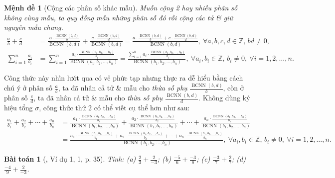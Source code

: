 \documentclass{article}
\newtheorem{baitoan}{Bài toán}
\newtheorem{menhde}{Mệnh đề}
\begin{document}
\begin{menhde}[Cộng các phân số khác mẫu]
	Muốn cộng 2 hay nhiều phân số không cùng mẫu, ta quy đồng mẫu những phân số đó rồi cộng các tử \& giữ nguyên mẫu chung.
	\begin{align*}
		\frac{a}{b} + \frac{c}{d} &= \frac{a\cdot\frac{\operatorname{BCNN}(b,d)}{b}}{\operatorname{BCNN}(b,d)} + \frac{c\cdot\frac{\operatorname{BCNN}(b,d)}{d}}{\operatorname{BCNN}(b,d)} = \frac{a\cdot\frac{\operatorname{BCNN}(b,d)}{b} + c\cdot\frac{\operatorname{BCNN}(b,d)}{d}}{\operatorname{BCNN}(b,d)},\ \forall a,b,c,d\in\mathbb{Z},\,bd\ne0,\\
		\sum_{i=1}^n \frac{a_i}{b_i} &= \sum_{i=1}^n \frac{a_i\cdot\frac{\operatorname{BCNN}(b_1,b_2,\ldots,b_n)}{b_i}}{\operatorname{BCNN}(b_1,b_2,\ldots,b_n)} = \frac{\sum_{i=1}^n a_i\cdot\frac{\operatorname{BCNN}(b_1,b_2,\ldots,b_n)}{b_i}}{\operatorname{BCNN}(b_1,b_2,\ldots,b_n)},\ \forall a_i,b_i\in\mathbb{Z},\,b_i\ne0,\ \forall i = 1,2,\ldots,n.
	\end{align*}
\end{menhde}
Công thức này nhìn lướt qua có vẻ phức tạp nhưng thực ra dễ hiểu bằng cách chú ý ở phân số $\frac{a}{b}$, ta đã nhân cả tử \& mẫu cho \textit{thừa số phụ} $\frac{\operatorname{BCNN}(b,d)}{b}$, còn ở phân số $\frac{c}{d}$, ta đã nhân cả tử \& mẫu cho \textit{thừa số phụ} $\frac{\operatorname{BCNN}(b,d)}{d}$. Không dùng ký hiệu tổng $\sigma$, công thức thứ 2 có thể viết cụ thể hơn như sau:
\begin{align*}
	\frac{a_1}{b_1} + \frac{a_2}{b_2} + \cdots + \frac{a_n}{b_n} &= \frac{a_1\cdot\frac{\operatorname{BCNN}(b_1,b_2,\ldots,b_n)}{b_1}}{\operatorname{BCNN}(b_1,b_2,\ldots,b_n)} + \frac{a_2\cdot\frac{\operatorname{BCNN}(b_1,b_2,\ldots,b_n)}{b_2}}{\operatorname{BCNN}(b_1,b_2,\ldots,b_n)} + \cdots + \frac{a_n\cdot\frac{\operatorname{BCNN}(b_1,b_2,\ldots,b_n)}{b_n}}{\operatorname{BCNN}(b_1,b_2,\ldots,b_n)}\\
	&= \frac{a_1\cdot\frac{\operatorname{BCNN}(b_1,b_2,\ldots,b_n)}{b_1} + a_2\cdot\frac{\operatorname{BCNN}(b_1,b_2,\ldots,b_n)}{b_2} + \cdots + a_n\cdot\frac{\operatorname{BCNN}(b_1,b_2,\ldots,b_n)}{b_n}}{\operatorname{BCNN}(b_1,b_2,\ldots,b_n)},\ \forall a_i,b_i\in\mathbb{Z},\,b_i\ne0,\ \forall i = 1,2,\ldots,n.
\end{align*}

\begin{baitoan}[\cite{SGK_Toan_6_Canh_Dieu_tap_2}, Ví dụ 1, 1, p. 35]
	Tính: (a) $\frac{2}{3} + \frac{2}{-3}$; (b) $\frac{-5}{6} + \frac{-3}{8}$; (c) $\frac{-3}{7} + \frac{2}{7}$; (d) $\frac{-4}{9} + \frac{2}{-3}$.
\end{baitoan}
\end{document}
